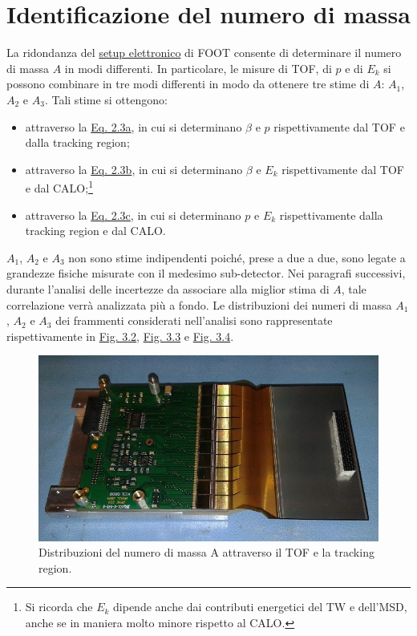 \documentclass[12pt,a4paper,twoside]{report}
\begin{document}
	\section{Identificazione del numero di massa}
	La ridondanza del \hyperref[sec:setupElettronico]{setup elettronico} di FOOT consente di determinare il numero di massa $A$ in modi differenti. In particolare, le misure di TOF, di $p$ e di $E_k$ si possono combinare in tre modi differenti in modo da ottenere tre stime di $A$: $A_1$, $A_2$ e $A_3$. Tali stime si ottengono:
	\begin{itemize}
		\item attraverso la \hyperref[eq:a1]{Eq. 2.3a}, in cui si determinano $\beta$ e $p$ rispettivamente dal TOF e dalla tracking region;
		\item attraverso la \hyperref[eq:a2]{Eq. 2.3b}, in cui si determinano $\beta$ e $E_k$ rispettivamente dal TOF e dal CALO;\footnote{Si ricorda che $E_k$ dipende anche dai contributi energetici del TW e dell'MSD, anche se in maniera molto minore rispetto al CALO.}
		\item attraverso la \hyperref[eq:a3]{Eq. 2.3c}, in cui si determinano $p$ e $E_k$ rispettivamente dalla tracking region e dal CALO.
	\end{itemize}
	$A_1$, $A_2$ e $A_3$ non sono stime indipendenti poiché, prese a due a due, sono legate a grandezze fisiche misurate con il medesimo sub-detector. Nei paragrafi successivi, durante l'analisi delle incertezze da associare alla miglior stima di $A$, tale correlazione verrà analizzata più a fondo. Le distribuzioni dei numeri di massa $A_1$, $A_2$ e $A_3$ dei frammenti considerati nell'analisi sono rappresentate rispettivamente in \hyperref[fig:a1]{Fig. 3.2}, \hyperref[fig:a2]{Fig. 3.3} e \hyperref[fig:a3]{Fig. 3.4}.
	\begin{figure}[H]
		\centering
		\includegraphics[width=0.9\linewidth]{msd.jpg}
		\caption{Distribuzioni del numero di massa A attraverso il TOF e la tracking region.}
		\label{fig:a1}
	\end{figure}
\end{document}

